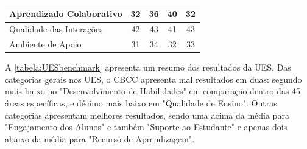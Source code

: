 \begin{table}[ht]
\begin{tabular}{|l|c|c|c|c|}
		Aprendizado Colaborativo                                                  & 32                                                                                             & 36                                                                                        & 40                                        & 32                                     \\ \hline
		Qualidade das Interações                                                  & 42                                                                                             & 43                                                                                        & 41                                        & 43                                     \\ \hline
		Ambiente de Apoio                                                         & 31                                                                                             & 34                                                                                        & 32                                        & 33                                     \\ \hline
	\end{tabular}
\end{table}

A \cref{tabela:UESbenchmark} apresenta um resumo dos resultados da UES. Das categorias gerais nos UES, o CBCC apresenta mal resultados em duas: segundo mais baixo no "Desenvolvimento de Habilidades" em comparação dentro das 45 áreas específicas, e décimo mais baixo em "Qualidade de Ensino". Outras categorias apresentam melhores resultados, sendo uma acima da média para "Engajamento dos Alunos" e também "Suporte ao Estudante" e apenas dois abaixo da média para "Recurso de Aprendizagem".

